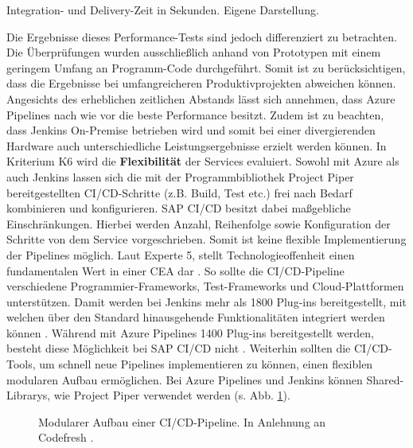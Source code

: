  \begin{center}
	\begin{table}[H]
		\centering
		\caption[Integration- und Delivery-Zeit in Sekunden]{Integration- und Delivery-Zeit in Sekunden. Eigene Darstellung.}
		\label{tab:Performance}
	\end{table}
\end{center}
\vspace*{-15mm}
 Die Ergebnisse dieses Performance-Tests sind jedoch differenziert zu betrachten. Die Überprüfungen wurden ausschließlich anhand von Prototypen mit einem geringem Umfang an Programm-Code durchgeführt. Somit ist zu berücksichtigen, dass die Ergebnisse bei umfangreicheren Produktivprojekten abweichen können. Angesichts des erheblichen zeitlichen Abstands lässt sich annehmen, dass Azure Pipelines nach wie vor die beste Performance besitzt. Zudem ist zu beachten, dass Jenkins On-Premise betrieben wird und somit bei einer divergierenden Hardware auch unterschiedliche Leistungsergebnisse erzielt werden können. In Kriterium K6 wird die \textbf{Flexibilität} der Services evaluiert. Sowohl mit Azure als auch Jenkins lassen sich die mit der Programmbibliothek Project Piper bereitgestellten CI/CD-Schritte (z.B. Build, Test etc.) frei nach Bedarf kombinieren und konfigurieren. SAP CI/CD besitzt dabei maßgebliche Einschränkungen. Hierbei werden Anzahl, Reihenfolge sowie Konfiguration der Schritte von dem Service vorgeschrieben. Somit ist keine flexible Implementierung der Pipelines möglich. Laut Experte 5, stellt Technologieoffenheit einen fundamentalen Wert in einer CEA dar \cite[Z. 13 ff.]{SoftwareArchitektSAPDTSIntegration.}. So sollte die CI/CD-Pipeline verschiedene Programmier-Frameworks, Test-Frameworks und Cloud-Plattformen unterstützen. Damit werden bei Jenkins mehr als 1800 Plug-ins bereitgestellt, mit welchen über den Standard hinausgehende Funktionalitäten integriert werden können \cite{.20230410c}. Während mit Azure Pipelines 1400 Plug-ins bereitgestellt werden, besteht diese Möglichkeit bei SAP CI/CD nicht \cite{.20230410d}. Weiterhin sollten die CI/CD-Tools, um schnell neue Pipelines implementieren zu können, einen flexiblen modularen Aufbau ermöglichen. Bei Azure Pipelines und Jenkins können Shared-Librarys, wie Project Piper verwendet werden (s. Abb. \ref{fig:Modular}).
 \begin{center}
	\begin{figure}[H]
		\centering
		\caption[Modularer Aufbau einer CI/CD-Pipeline]{Modularer Aufbau einer CI/CD-Pipeline. In Anlehnung an Codefresh \cite{.20230402}.}
		\label{fig:Modular}
	\end{figure}
\end{center}
